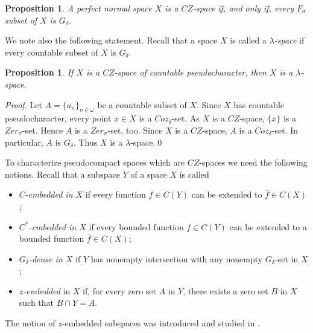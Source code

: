 \documentclass[preprint,11pt]{elsarticle}
\newtheorem{proposition}[theorem]{Proposition}
\newtheorem{definition}[theorem]{Definition}
\numberwithin{equation}{section}
\numberwithin{theorem}{section}
\newcommand{\w}{\omega}
\begin{document}
\begin{proposition} \label{p:pn-CZ=sigma}
A perfect normal space $X$ is a $CZ$-space if, and only if, every $F_{\sigma}$ subset of $X$ is $G_{\delta}$. %
\end{proposition}


We note also the following statement. Recall that a space $X$ is called a {\em $\lambda$-space} if every countable subset of $X$ is $G_{\delta}$.
\begin{proposition} \label{p:CZ-cp=>lambda}
If $X$ is a $CZ$-space of countable pseudocharacter, then $X$ is a $\lambda$-space.
\end{proposition}

\begin{proof}
Let $A=\{a_n\}_{n\in\w}$ be a countable subset of $X$. Since $X$ has countable pseudocharacter, every point $x\in X$ is a $Coz_\delta$-set. As $X$ is a $CZ$-space, $\{x\}$ is a  $Zer_\sigma$-set. Hence $A$ is a $Zer_\sigma$-set, too. Since $X$ is a $CZ$-space, $A$ is a $Coz_\delta$-set. In particular, $A$ is $G_{\delta}$. Thus $X$ is a $\lambda$-space.\qed
\end{proof}

To characterize pseudocompact spaces which are $CZ$-spaces we need the following notions. Recall that a subspace $Y$ of a space $X$ is called
\begin{itemize}
\item {\em $C$-embedded in $X$} if every function $f\in C(Y)$ can be extended to $\bar f\in C(X)$;
\item {\em $C^\ast$-embedded in $X$} if every bounded function $f\in C(Y)$ can be extended to a bounded function $\bar f\in C(X)$;
\item {\em $G_\delta$-dense in $X$} if $Y$ has nonempty intersection with any nonempty $G_\delta$-set in $X$;
\item {\em $z$-embedded} in $X$ if, for every zero set $A$ in $Y$, there exists a zero set $B$ in $X$ such that $B \cap Y = A$.
\end{itemize}
The notion of $z$-embedded subspaces was introduced and studied in \cite{Bl-H}.

\end{document}
